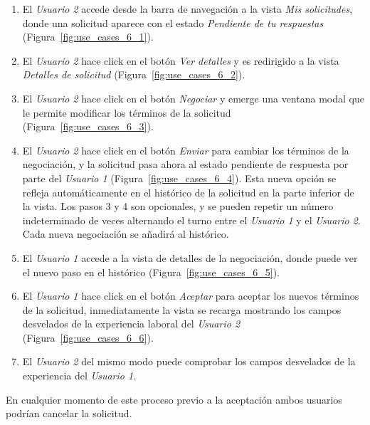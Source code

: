 \documentclass[a4paper, 12pt]{book}
\begin{document}
    \begin{enumerate}
        \item El \emph{Usuario 2} accede desde la barra de navegación a la vista \emph{Mis solicitudes},
        donde una solicitud aparece con el estado \emph{Pendiente de tu respuestas} (Figura~\ref{fig:use_cases_6_1}).
        \item El \emph{Usuario 2} hace click en el botón \emph{Ver detalles} y es redirigido
        a la vista \emph{Detalles de solicitud} (Figura~\ref{fig:use_cases_6_2}).
        \item El \emph{Usuario 2} hace click en el botón \emph{Negociar} y emerge una ventana modal que le permite modificar
        los términos de la solicitud (Figura~\ref{fig:use_cases_6_3}).
        \item El \emph{Usuario 2} hace click en el botón \emph{Enviar} para cambiar los términos de la negociación,
        y la solicitud pasa ahora al estado pendiente de respuesta por parte del \emph{Usuario 1} (Figura~\ref{fig:use_cases_6_4}).
        Esta nueva opción se refleja automáticamente en el histórico de la solicitud en la parte inferior de la vista.
        Los pasos 3 y 4 son opcionales, y se pueden repetir un número indeterminado de veces alternando el turno
        entre el \emph{Usuario 1} y el \emph{Usuario 2}. Cada nueva negociación se añadirá al histórico.
        \item El \emph{Usuario 1} accede a la vista de detalles de la negociación, donde puede ver el nuevo paso en el
        histórico (Figura~\ref{fig:use_cases_6_5}).
        \item El \emph{Usuario 1} hace click en el botón \emph{Aceptar} para aceptar los nuevos términos de la solicitud, inmediatamente
        la vista se recarga mostrando los campos desvelados de la experiencia laboral del \emph{Usuario 2} (Figura~\ref{fig:use_cases_6_6}).
        \item El \emph{Usuario 2} del mismo modo puede comprobar los campos desvelados de la experiencia del \emph{Usuario 1}.
    \end{enumerate}

    En cualquier momento de este proceso previo a la aceptación ambos usuarios podrían cancelar la solicitud.


\end{document}
